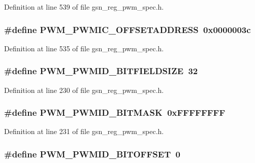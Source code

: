Definition at line 539 of file gsn\_\-reg\_\-pwm\_\-spec.h.

\hypertarget{a00565_a4ed506b6b0291be53741bd7a9ced73a5}{
\subsubsection[{PWM\_\-PWMIC\_\-OFFSETADDRESS}]{\setlength{\rightskip}{0pt plus 5cm}\#define PWM\_\-PWMIC\_\-OFFSETADDRESS~0x0000003c}}
\label{a00565_a4ed506b6b0291be53741bd7a9ced73a5}


Definition at line 535 of file gsn\_\-reg\_\-pwm\_\-spec.h.

\hypertarget{a00565_a890c82cbcf55f493d7b1e7ea19bfe54a}{
\subsubsection[{PWM\_\-PWMID\_\-BITFIELDSIZE}]{\setlength{\rightskip}{0pt plus 5cm}\#define PWM\_\-PWMID\_\-BITFIELDSIZE~32}}
\label{a00565_a890c82cbcf55f493d7b1e7ea19bfe54a}


Definition at line 230 of file gsn\_\-reg\_\-pwm\_\-spec.h.

\hypertarget{a00565_ab10df0efef0c94288e260ab197d40a5b}{
\subsubsection[{PWM\_\-PWMID\_\-BITMASK}]{\setlength{\rightskip}{0pt plus 5cm}\#define PWM\_\-PWMID\_\-BITMASK~0xFFFFFFFF}}
\label{a00565_ab10df0efef0c94288e260ab197d40a5b}


Definition at line 231 of file gsn\_\-reg\_\-pwm\_\-spec.h.

\hypertarget{a00565_ab16f58c2ba3dd62d1cb62c7bc545ef17}{
\subsubsection[{PWM\_\-PWMID\_\-BITOFFSET}]{\setlength{\rightskip}{0pt plus 5cm}\#define PWM\_\-PWMID\_\-BITOFFSET~0}}
\label{a00565_ab16f58c2ba3dd62d1cb62c7bc545ef17}


